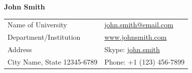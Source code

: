 \documentclass[letterpaper,11pt,oneside]{article}
\newcommand*{\Skype}{\href{skype:john.smith?add}{john.smith}}
\newcommand{\Absender}[1][\normalsize]{\Skype}
\begin{document}

\noindent  \LARGE{\textbf{John Smith}}  \\
\vspace{-2ex}
\hline 
\normalsize


\begin{center}
\begin{tabular}{l l}
 Name of University    & \hspace{1in} \href{mailto:john.smith@email.com}{john.smith@email.com} \\
 Department/Institution    & \hspace{1in}  \href{www.johnsmith.com}{www.johnsmith.com}   \\
 Address             & \hspace{1in} Skype: \Absender  \\
 City Name, State 12345-6789 & \hspace{1in} Phone: +1 (123) 456-7899 \\
\end{tabular}
\end{center}

\vspace{1em}

\end{document}
